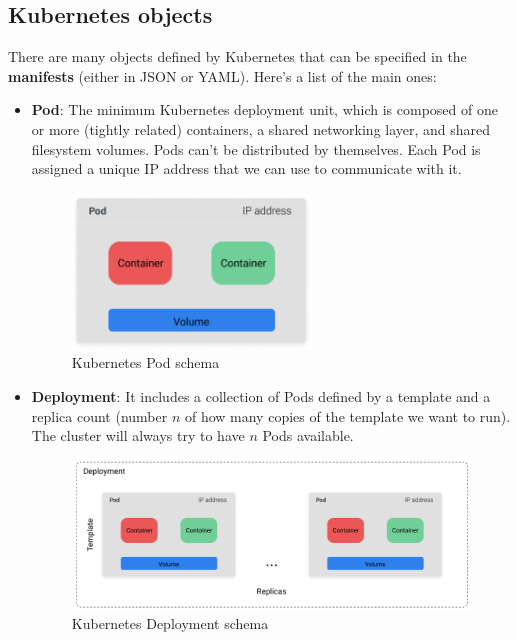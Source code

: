 \subsection{Kubernetes objects}

There are many objects defined by Kubernetes that can be specified in the \textbf{manifests} (either in JSON or YAML). Here's a list of the main ones:
\begin{itemize}
    \item \textbf{Pod}: The minimum Kubernetes deployment unit, which is composed of one or more (tightly related) containers, a shared networking layer, and shared filesystem volumes. Pods can't be distributed by themselves. Each Pod is assigned a unique IP address that we can use to communicate with it.
    \begin{figure} [H]
        \centering
        \includegraphics[width=0.6\textwidth]{images/Cloud/K8sPod.png}
        \caption{Kubernetes Pod schema}
        \label{fig:K8sPod}
    \end{figure}
    \item \textbf{Deployment}: It includes a collection of Pods defined by a template and a replica count (number \(n\) of how many copies of the template we want to run). The cluster will always try to have \(n\) Pods available.
    \begin{figure} [H]
        \centering
        \includegraphics[width=1\textwidth]{images/Cloud/K8sDeployment.png}
        \caption{Kubernetes Deployment schema}
        \label{fig:K8sReplica}
    \end{figure}

\end{itemize}

